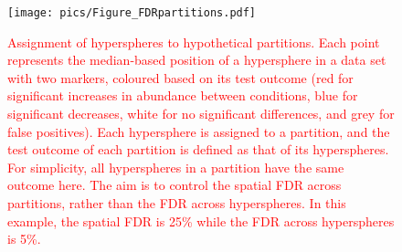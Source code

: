 \documentclass{article}
\newcommand\revised[1]{\textcolor{red}{#1}}
\begin{document}
\begin{figure}[tbp]
    \begin{center}
        \texttt{[image: pics/Figure\_FDRpartitions.pdf]}
    \end{center}
    \caption{\revised{Assignment of hyperspheres to hypothetical partitions.
        Each point represents the median-based position of a hypersphere in a data set with two markers, coloured based on its test outcome
        (red for significant increases in abundance between conditions, blue for significant decreases, white for no significant differences, and grey for false positives).
        Each hypersphere is assigned to a partition, and the test outcome of each partition is defined as that of its hyperspheres.
        For simplicity, all hyperspheres in a partition have the same outcome here.
        The aim is to control the spatial FDR across partitions, rather than the FDR across hyperspheres.
        In this example, the spatial FDR is 25\% while the FDR across hyperspheres is 5\%.
    }
}
    \label{fig:fdrdemo}
\end{figure}

\end{document}
